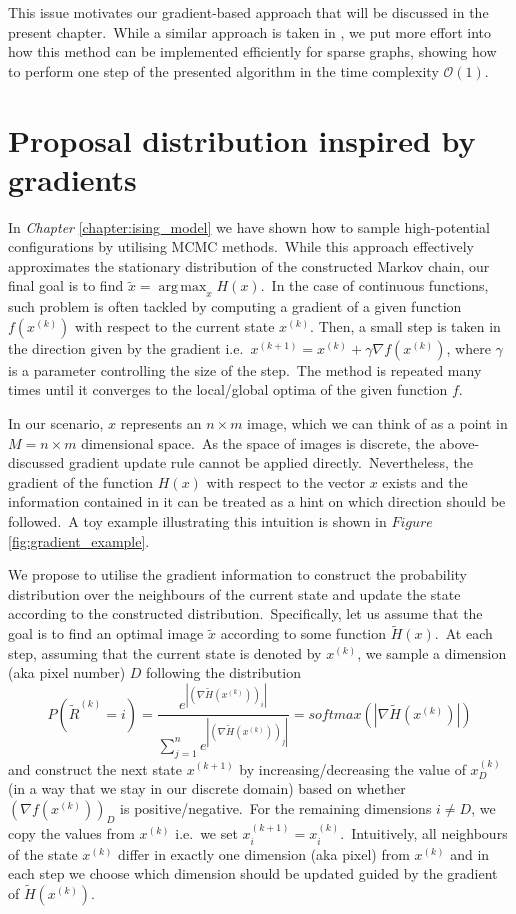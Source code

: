 \documentclass[shortabstract, english, lic]{iithesis}
\DeclareMathOperator*{\argmax}{arg\,max}
\theoremstyle{default_theorem_style}\newtheorem{theorem}{Theorem}
\theoremstyle{default_theorem_style}\newtheorem{definition}{Definition}
\begin{document}
\noindent This issue motivates our gradient-based approach
that will be discussed in the present chapter.\ While a similar approach is taken in \cite{oops_gradient}, we put
more effort into how this method can be implemented efficiently for sparse graphs, showing how to perform one
step of the presented algorithm in the time complexity $\mathcal{O}(1)$.

\section{Proposal distribution inspired by gradients}

In \textit{Chapter} \ref{chapter:ising_model} we have shown how to sample high-potential configurations by
utilising MCMC methods.\ While this approach effectively approximates the stationary distribution of the constructed
Markov chain, our final goal is to find $\tilde{x} = \argmax_x H(x)$.\ In the case of continuous functions, such problem
is often tackled by computing a gradient of a given function $f(x^{(k)})$ with respect to the current state $x^{(k)}$.
Then, a small step is taken in the direction given by the gradient
i.e.\ $x^{(k + 1)} = x^{(k)} + \gamma \nabla f(x^{(k)})$, where $\gamma$ is a parameter
controlling the size of the step.\ The method is repeated many times until it converges to the local/global optima of
the given function $f$.\newline

\noindent In our scenario, $x$ represents an $n \times m$ image, which we can think of as a point in
$M = n \times m$ dimensional space.\ As the space of images is discrete, the above-discussed gradient update rule
cannot be applied directly.\ Nevertheless, the gradient of the function $H(x)$ with respect to the vector $x$ exists
and the information contained in it can be treated as a hint on which direction should be followed.\ A toy example
illustrating this intuition is shown in $Figure$ \ref{fig:gradient_example}.\newline

\noindent We propose to utilise the gradient information to construct the probability distribution over the
neighbours of the current state and update the state according to the constructed distribution.\ Specifically, let
us assume that the goal is to find an optimal image $\tilde{x}$ according to some function $\tilde{H}(x)$.\ At each
step, assuming that the current state is denoted by $x^{(k)}$, we sample a dimension (aka pixel number) $D$
following the distribution
$$
P(\tilde{R}^{(k)} = i) = \frac{e^{|(\nabla \tilde{H}(x^{(k)}))_i|}}{\sum\limits_{j = 1}^{n}
e^{|(\nabla \tilde{H}(x^{(k)}))_j|}} = softmax(|\nabla \tilde{H}(x^{(k)})|)
$$
and construct the next state $x^{(k + 1)}$ by increasing/decreasing the value of
$x^{(k)}_D$ (in a way that we stay in our discrete domain) based on whether $(\nabla f(x^{(k)}))_D$ is
positive/negative.\ For the remaining dimensions $i \neq D$, we copy the values from
$x^{(k)}$ i.e.\ we set $x^{(k + 1)}_i = x^{(k)}_i$.\ Intuitively, all neighbours of the state $x^{(k)}$
differ in exactly one dimension (aka pixel) from $x^{(k)}$ and in each step we choose which dimension
should be updated guided by the gradient of $\tilde{H}(x^{(k)})$.\newline
\end{document}
